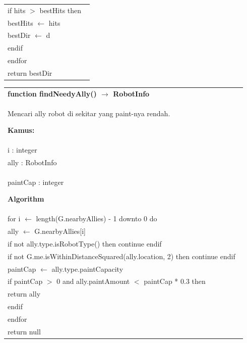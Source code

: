 \documentclass{article}
\newenvironment{pseudobox}
{
\centering
\begin{longtable}{|p{0.94\linewidth}|}
\hline
}
{
\\ \hline
\end{longtable}
\vspace{0.05cm}
}
\begin{document}
\begin{pseudobox}
\hspace*{2em} if hits $>$ bestHits then \\
\hspace*{3em} bestHits $\leftarrow$ hits \\
\hspace*{3em} bestDir $\leftarrow$ d \\
\hspace*{2em} endif \\
\hspace*{1em} endfor \\

\hspace*{1em} return bestDir
\end{pseudobox}

\begin{pseudobox}
\textbf{function findNeedyAlly() $\rightarrow$ RobotInfo} \\
{ Mencari ally robot di sekitar yang paint-nya rendah. }

\textbf{Kamus:} \\
\hspace*{1em} i : integer \\
\hspace*{1em} ally : RobotInfo \\
\hspace*{1em} paintCap : integer

\textbf{Algorithm} \\
\hspace*{1em} for i $\leftarrow$ length(G.nearbyAllies) - 1 downto 0 do \\
\hspace*{2em} ally $\leftarrow$ G.nearbyAllies[i] \\
\hspace*{2em} if not ally.type.isRobotType() then continue endif \\
\hspace*{2em} if not G.me.isWithinDistanceSquared(ally.location, 2) then continue endif \\

\hspace*{2em} paintCap $\leftarrow$ ally.type.paintCapacity \\
\hspace*{2em} if paintCap $>$ 0 and ally.paintAmount $<$ paintCap * 0.3 then \\
\hspace*{3em} return ally \\
\hspace*{2em} endif \\
\hspace*{1em} endfor \\

\hspace*{1em} return null
\end{pseudobox}
\end{document}
